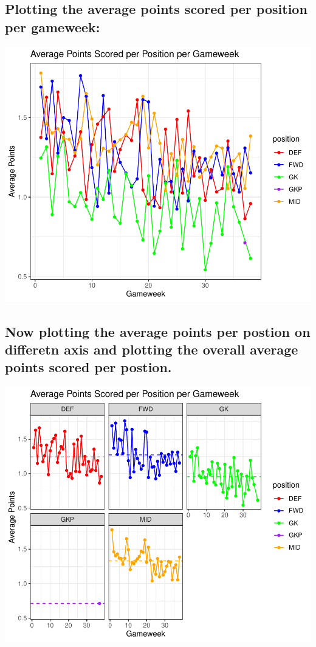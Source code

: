 \documentclass[11pt,preprint, authoryear]{elsarticle}
\numberwithin{equation}{section}
\numberwithin{figure}{section}
\numberwithin{table}{section}
\begin{document}
\hypertarget{plotting-the-average-points-scored-per-position-per-gameweek}{%
\subsection{Plotting the average points scored per position per
gameweek:}\label{plotting-the-average-points-scored-per-position-per-gameweek}}

\includegraphics{Fantasy_premier_league_team_prediction_files/figure-latex/unnamed-chunk-4-1.pdf}

\hypertarget{now-plotting-the-average-points-per-postion-on-differetn-axis-and-plotting-the-overall-average-points-scored-per-postion.}{%
\subsection{Now plotting the average points per postion on differetn
axis and plotting the overall average points scored per
postion.}\label{now-plotting-the-average-points-per-postion-on-differetn-axis-and-plotting-the-overall-average-points-scored-per-postion.}}

\includegraphics{Fantasy_premier_league_team_prediction_files/figure-latex/unnamed-chunk-5-1.pdf}
\end{document}
